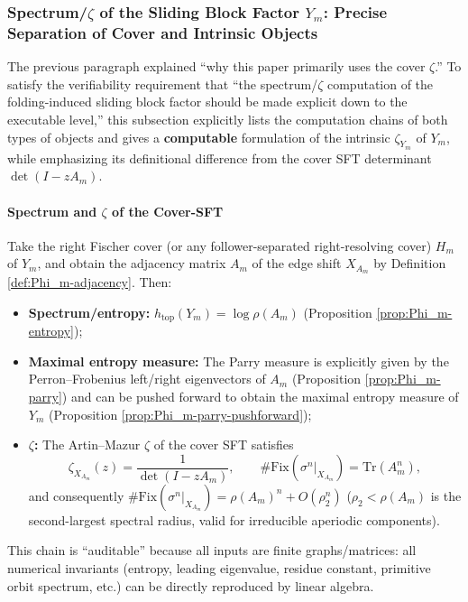 \subsubsection{Spectrum/\texorpdfstring{$\zeta$}{zeta} of the Sliding Block Factor \texorpdfstring{$Y_m$}{Ym}: Precise Separation of Cover and Intrinsic Objects}\label{subsec:Ym-zeta-spectrum}
The previous paragraph explained ``why this paper primarily uses the cover \(\zeta\).'' To satisfy the verifiability requirement that ``the spectrum/\(\zeta\) computation of the folding-induced sliding block factor should be made explicit down to the executable level,'' this subsection explicitly lists the computation chains of both types of objects and gives a \textbf{computable} formulation of the intrinsic \(\zeta_{Y_m}\) of \(Y_m\), while emphasizing its definitional difference from the cover SFT determinant \(\det(I-zA_m)\).

\paragraph{Spectrum and \texorpdfstring{$\zeta$}{zeta} of the Cover-SFT}
Take the right Fischer cover (or any follower-separated right-resolving cover) \(H_m\) of \(Y_m\), and obtain the adjacency matrix \(A_m\) of the edge shift \(X_{A_m}\) by Definition \ref{def:Phi_m-adjacency}. Then:
\begin{itemize}
  \item \textbf{Spectrum/entropy:} \(h_{\mathrm{top}}(Y_m)=\log\rho(A_m)\) (Proposition \ref{prop:Phi_m-entropy});
  \item \textbf{Maximal entropy measure:} The Parry measure is explicitly given by the Perron--Frobenius left/right eigenvectors of \(A_m\) (Proposition \ref{prop:Phi_m-parry}) and can be pushed forward to obtain the maximal entropy measure of \(Y_m\) (Proposition \ref{prop:Phi_m-parry-pushforward});
  \item \textbf{\(\zeta\):} The Artin--Mazur \(\zeta\) of the cover SFT satisfies
  \[
  \zeta_{X_{A_m}}(z)=\frac{1}{\det(I-zA_m)},
  \qquad
  \#\mathrm{Fix}(\sigma^n|_{X_{A_m}})=\mathrm{Tr}(A_m^n),
  \]
  and consequently
  \(
  \#\mathrm{Fix}(\sigma^n|_{X_{A_m}})=\rho(A_m)^n+O(\rho_2^n)
  \)
  (\(\rho_2<\rho(A_m)\) is the second-largest spectral radius, valid for irreducible aperiodic components).
\end{itemize}
This chain is ``auditable'' because all inputs are finite graphs/matrices: all numerical invariants (entropy, leading eigenvalue, residue constant, primitive orbit spectrum, etc.) can be directly reproduced by linear algebra.


